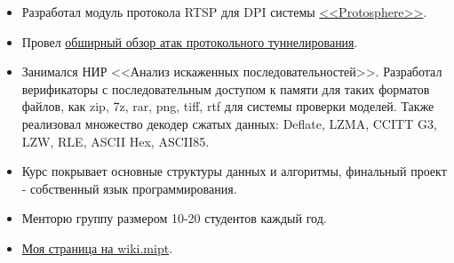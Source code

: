 \documentclass[10pt,a4paper,normalphoto]{altacv}
\begin{document}
\begin{itemize}
\item Разработал модуль протокола RTSP для DPI системы \href{https://www.ispras.ru/en/technologies/protosphere/}{<<Protosphere>>}.
\item Провел \href{https://github.com/Panterrich/FTE/blob/master/fte.pdf}{обширный обзор атак протокольного туннелирования}.
\item Занимался НИР <<Анализ искаженных последовательностей>>.
Разработал верификаторы с последовательным доступом к памяти для таких форматов файлов, как zip, 7z, rar, png, tiff, rtf для системы проверки моделей.
Также реализовал множество декодер сжатых данных: Deflate, LZMA, CCITT G3, LZW, RLE, ASCII Hex, ASCII85.
\end{itemize}

\medskip

\begin{itemize}
    \item Курс покрывает основные структуры данных и алгоритмы, финальный проект - собственный язык программирования.
    \item Менторю группу размером 10-20 студентов каждый год.
    \item \href{https://wiki.mipt.tech/index.php/%D0%94%D1%83%D1%80%D0%BD%D0%BE%D0%B2%5F%D0%90%D0%BB%D0%B5%D0%BA%D1%81%D0%B5%D0%B9%5F%D0%9D%D0%B8%D0%BA%D0%BE%D0%BB%D0%B0%D0%B5%D0%B2%D0%B8%D1%87}{Моя страница на wiki.mipt}.
\end{itemize}

\divider

\clearpage
\end{document}
